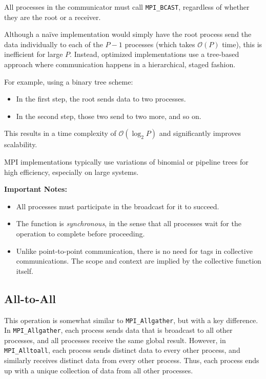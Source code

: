 \documentclass[12pt]{book}
\begin{document}
All processes in the communicator must call \texttt{MPI\_BCAST}, regardless of whether they are the root or a receiver.

\vspace{1em}
Although a naïve implementation would simply have the root process send the data individually to each of the $P - 1$ processes (which takes $\mathcal{O}(P)$ time), this is inefficient for large $P$. Instead, optimized implementations use a tree-based approach where communication happens in a hierarchical, staged fashion.

For example, using a binary tree scheme:
\begin{itemize}
    \item In the first step, the root sends data to two processes.
    \item In the second step, those two send to two more, and so on.
\end{itemize}
This results in a time complexity of $\mathcal{O}(\log_2 P)$ and significantly improves scalability.

MPI implementations typically use variations of binomial or pipeline trees for high efficiency, especially on large systems.

\vspace{1em}
\textbf{Important Notes:}
\begin{itemize}
    \item All processes must participate in the broadcast for it to succeed.
    \item The function is \emph{synchronous}, in the sense that all processes wait for the operation to complete before proceeding.
    \item Unlike point-to-point communication, there is no need for tags in collective communications. The scope and context are implied by the collective function itself.
\end{itemize}

\subsection{All-to-All}

This operation is somewhat similar to \texttt{MPI\_Allgather}, but with a key difference. In \texttt{MPI\_Allgather}, each process sends data that is broadcast to all other processes, and all processes receive the same global result. However, in \texttt{MPI\_Alltoall}, each process sends distinct data to every other process, and similarly receives distinct data from every other process. Thus, each process ends up with a unique collection of data from all other processes.
\end{document}
